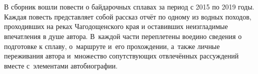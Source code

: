 \chapter*{}

В сборник вошли повести о байдарочных сплавах за период с 2015 по 2019 годы. Каждая повесть представляет собой рассказ отчёт по одному из водных походов, проходивших на реках Чагодощенского края и оставивших неизгладимые впечатления в душе автора. В~каждой части переплетены воедино сведения о подготовке к сплаву, о~маршруте и~его прохождении, а~также личные переживания автора и~множество сопутствующих отвлечённых рассуждений вместе с~элементами автобиографии.

\vspace{\fill}
